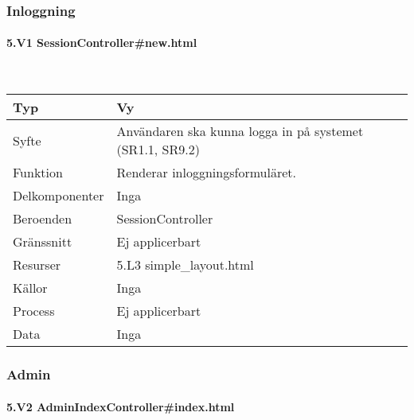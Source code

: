 \documentclass[a4paper, twoside, 11pt, titlepage]{article}
\begin{document}
		\subsubsection{Inloggning}



			\paragraph{5.V1 SessionController\#new.html}\

			\begin {table} [ht] \begin{tabular} {  p{3.5cm} p{9.6cm} }
				\hline
				Typ & Vy  \\
				\hline
				Syfte & Användaren ska kunna logga in på systemet (SR1.1, SR9.2)  \\
				\hline
				Funktion & Renderar inloggningsformuläret.  \\
				\hline
				Delkomponenter & Inga  \\
				\hline
				Beroenden & SessionController  \\
				\hline
				Gränssnitt & Ej applicerbart  \\
				\hline
				Resurser & 5.L3 simple\_layout.html  \\
				\hline
				Källor & Inga  \\
				\hline
				Process & Ej applicerbart  \\
				\hline
				Data & Inga  \\
				\hline
			\end{tabular} \end{table} \FloatBarrier


		\subsubsection{Admin}



			\paragraph{5.V2 AdminIndexController\#index.html}\
\end{document}
